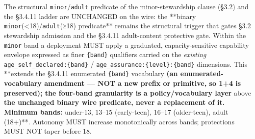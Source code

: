 \documentclass[11pt]{article}
\begin{document}
The structural \texttt{minor}/\texttt{adult} predicate of the minor-stewardship clause (§3.2) and the §3.4.11 ladder are UNCHANGED on the wire: the **binary \texttt{minor}(<18)/\texttt{adult}(≥18) predicate** remains the structural trigger that gates §3.2 stewardship admission and the §3.4.11 adult-content protective gate. Within the \texttt{minor} band a deployment MUST apply a graduated, capacity-sensitive capability envelope expressed as finer \texttt{\{band\}} qualifiers carried on the \textit{existing} \texttt{age\_self\_declared:\{band\}} / \texttt{age\_assurance:\{level\}:\{band\}} dimensions. This **extends the §3.4.11 enumerated \texttt{\{band\}} vocabulary\textbf{ (an enumerated-vocabulary amendment — NOT a new prefix or primitive, so 1+4 is preserved); the four-band granularity is a policy/vocabulary layer }above\textbf{ the unchanged binary wire predicate, never a replacement of it. Minimum bands: }under-13, 13–15 (early-teen), 16–17 (older-teen), adult (18+)**. Autonomy MUST increase monotonically across bands; protections MUST NOT taper before 18.
\end{document}
